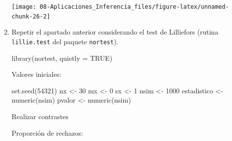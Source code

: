 \documentclass[
]{book}
\newenvironment{Shaded}{\begin{snugshade}}{\end{snugshade}}
\newcommand{\AttributeTok}[1]{\textcolor[rgb]{0.77,0.63,0.00}{#1}}
\newcommand{\CommentTok}[1]{\textcolor[rgb]{0.56,0.35,0.01}{\textit{#1}}}
\newcommand{\ConstantTok}[1]{\textcolor[rgb]{0.00,0.00,0.00}{#1}}
\newcommand{\ControlFlowTok}[1]{\textcolor[rgb]{0.13,0.29,0.53}{\textbf{#1}}}
\newcommand{\DecValTok}[1]{\textcolor[rgb]{0.00,0.00,0.81}{#1}}
\newcommand{\FunctionTok}[1]{\textcolor[rgb]{0.00,0.00,0.00}{#1}}
\newcommand{\NormalTok}[1]{#1}
\newcommand{\OtherTok}[1]{\textcolor[rgb]{0.56,0.35,0.01}{#1}}
\newcommand{\SpecialCharTok}[1]{\textcolor[rgb]{0.00,0.00,0.00}{#1}}
\theoremstyle{break}
\theoremstyle{definition}
\theoremstyle{definition}
\theoremstyle{definition}
\theoremstyle{definition}
\theoremstyle{remark}
\begin{document}
\begin{enumerate}
  \begin{center}\texttt{[image: 08-Aplicaciones\_Inferencia\_files/figure-latex/unnamed-chunk-26-2]} \end{center}
\item
  Repetir el apartado anterior considerando el test de Lilliefors
  (rutina \texttt{lillie.test} del paquete \texttt{nortest}).

\begin{Shaded}
\begin{Highlighting}[]
\FunctionTok{library}\NormalTok{(nortest, }\AttributeTok{quietly =} \ConstantTok{TRUE}\NormalTok{)}
\end{Highlighting}
\end{Shaded}

  Valores iniciales:

\begin{Shaded}
\begin{Highlighting}[]
\FunctionTok{set.seed}\NormalTok{(}\DecValTok{54321}\NormalTok{)}
\NormalTok{nx }\OtherTok{\textless{}{-}} \DecValTok{30}
\NormalTok{mx }\OtherTok{\textless{}{-}} \DecValTok{0}
\NormalTok{sx }\OtherTok{\textless{}{-}} \DecValTok{1}
\NormalTok{nsim }\OtherTok{\textless{}{-}} \DecValTok{1000}
\NormalTok{estadistico }\OtherTok{\textless{}{-}} \FunctionTok{numeric}\NormalTok{(nsim)}
\NormalTok{pvalor }\OtherTok{\textless{}{-}} \FunctionTok{numeric}\NormalTok{(nsim)}
\end{Highlighting}
\end{Shaded}

  Realizar contrastes

\begin{Shaded}
\end{Shaded}

  Proporción de rechazos:


\end{enumerate}
\end{document}

